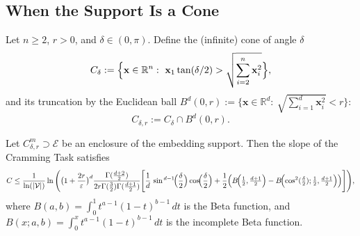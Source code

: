 \subsection{When the Support Is a Cone}

Let $n\ge 2$, $r>0$, and $\delta\in(0,\pi)$. Define the (infinite) cone of angle $\delta$
\[
C_\delta:=\Bigl\{\mathbf x\in\mathbb R^{n}:\ \mathbf x_1\tan(\delta/2)>\sqrt{\sum_{i=2}^n\mathbf x_i^2}\Bigr\},
\]
and its truncation by the Euclidean ball $B^d(0,r):=\{\mathbf x\in\mathbb R^d:\ \sqrt{\sum_{i=1}^d\mathbf x_i^2}<r\}$:
\[
C_{\delta,r}:=C_\delta\cap B^d(0,r).
\]

\begin{proposition}
    Let $C_{\delta,r}^m\supset\mathcal E$ be an enclosure of the embedding support. Then the slope of the Cramming Task satisfies \[C\leq \frac 1{\operatorname{ln}(|\mathcal V|)}\operatorname{ln}\Bigg(\big(1+\frac{2r}\varepsilon\big)^d\frac{\Gamma(\frac{d+2}2)} {2r\Gamma(\frac{3}2)\Gamma(\frac{d+1}2)}
    \Bigg[\frac{1}{d}\,\sin^{\,d-1}\!\Bigl(\frac{\delta}{2}\Bigr)\cos\!\Bigl(\frac{\delta}{2}\Bigr)
+\frac{1}{2}\Bigl(B\!\Bigl(\tfrac12,\tfrac{d+1}{2}\Bigr)-B\!\Bigl(\cos^2(\tfrac{\delta}{2});\tfrac12,\tfrac{d+1}{2}\Bigr)\Bigr)\Bigg]\Bigg),\] where $B(a,b)=\int_0^1 t^{a-1}(1-t)^{b-1}\,dt$ is the Beta function, and
$B(x;a,b)=\int_0^x t^{a-1}(1-t)^{b-1}\,dt$ is the incomplete Beta function.
\end{proposition}

